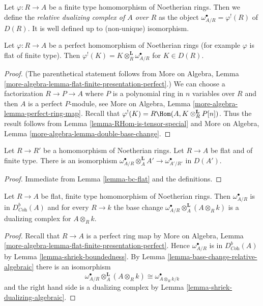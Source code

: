 \noindent
Let $\varphi : R \to A$ be a finite type homomorphism of
Noetherian rings. Then we define the {\it relative dualizing
complex of $A$ over $R$} as the object
$\omega_{A/R}^\bullet = \varphi^!(R)$ of $D(R)$.
It is well defined up to (non-unique) isomorphism.

\begin{lemma}
\label{lemma-upper-shriek-is-tensor-functor}
Let $\varphi : R \to A$ be a perfect homomorphism of Noetherian rings
(for example $\varphi$ is flat of finite type).
Then $\varphi^!(K) = K \otimes_R^\mathbf{L} \omega_{A/R}^\bullet$
for $K \in D(R)$.
\end{lemma}

\begin{proof}
(The parenthetical statement follows from
More on Algebra, Lemma
\ref{more-algebra-lemma-flat-finite-presentation-perfect}.)
We can choose a factorization $R \to P \to A$ where $P$ is a polynomial
ring in $n$ variables over $R$ and then $A$ is a perfect $P$-module, see
More on Algebra, Lemma \ref{more-algebra-lemma-perfect-ring-map}.
Recall that $\varphi^!(K) = R\Hom(A, K \otimes_R^\mathbf{L} P[n])$.
Thus the result follows from Lemma \ref{lemma-RHom-is-tensor-special}
and More on Algebra, Lemma \ref{more-algebra-lemma-double-base-change}.
\end{proof}

\begin{lemma}
\label{lemma-base-change-relative-algebraic}
Let $R \to R'$ be a homomorphism of Noetherian rings.
Let $R \to A$ be flat and of finite type. There is an isomorphism
$\omega_{A/R}^\bullet \otimes_A^\mathbf{L} A' \to \omega^\bullet_{A'/R'}$
in $D(A')$.
\end{lemma}

\begin{proof}
Immediate from Lemma \ref{lemma-bc-flat} and the definitions.
\end{proof}

\begin{lemma}
\label{lemma-relative-dualizing-algebraic}
Let $R \to A$ be flat, finite type homomorphism of Noetherian rings.
Then $\omega_{A/R}^\bullet$ is in $D^b_{\textit{Coh}}(A)$
and for every $R \to k$ the base change
$\omega_{A/R}^\bullet \otimes_A^\mathbf{L} (A \otimes_R k)$
is a dualizing complex for $A \otimes_R k$.
\end{lemma}

\begin{proof}
Recall that $R \to A$ is a perfect ring map by More on Algebra, Lemma
\ref{more-algebra-lemma-flat-finite-presentation-perfect}.
Hence $\omega_{A/R}^\bullet$ is in $D^b_{\textit{Coh}}(A)$
by Lemma \ref{lemma-shriek-boundedness}.
By Lemma \ref{lemma-base-change-relative-algebraic}
there is an isomorphism
$$
\omega_{A/R}^\bullet \otimes_A^\mathbf{L} (A \otimes_R k) \cong
\omega^\bullet_{A \otimes_R k/k}
$$
and the right hand side is a dualizing complex by
Lemma \ref{lemma-shriek-dualizing-algebraic}.
\end{proof}







